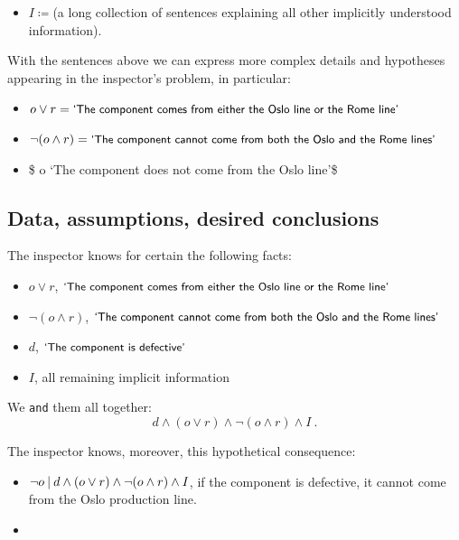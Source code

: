 \documentclass[
  a4paper,
  DIV=11,
  numbers=noendperiod,
  oneside]{scrreprt}
\providecommand{\tightlist}{%
  \setlength{\itemsep}{0pt}\setlength{\parskip}{0pt}}\usepackage{longtable,booktabs,array}
\begin{document}
\begin{itemize}
\tightlist
\item
  \(I \coloneqq{}\)(a long collection of sentences explaining all other
  implicitly understood information).\\
\end{itemize}

With the sentences above we can express more complex details and
hypotheses appearing in the inspector's problem, in particular:

\begin{itemize}
\item
  \(o \lor r = \textsf{\small`The component comes from either the Oslo line or the Rome line'}\)
\item
  \(\lnot(o \land r) = \textsf{\small`The component cannot come from both the Oslo and the Rome lines'}\)
\item
  \$ \lnot o
  \coloneqq \textsf{\small`The component does not come from the Oslo line'}\$
\end{itemize}

\hypertarget{data-assumptions-desired-conclusions}{%
\subsection{Data, assumptions, desired
conclusions}\label{data-assumptions-desired-conclusions}}

The inspector knows for certain the following facts:

\begin{itemize}
\item
  \(o \lor r\),
  \(\textsf{\small`The component comes from either the Oslo line or the Rome line'}\)
\item
  \(\lnot(o \land r)\),
  \(\textsf{\small`The component cannot come from both the Oslo and the Rome lines'}\)
\item
  \(d\), \(\textsf{\small`The component is defective'}\)
\item
  \(I\), all remaining implicit information
\end{itemize}

We \texttt{and} them all together: \[
d \land (o \lor r) \land \lnot (o \land r) \land I \ .
\]

The inspector knows, moreover, this hypothetical consequence:

\begin{itemize}
\item
  \(\lnot o \nonscript\:\vert\nonscript\:\mathopen{} d \land (o \lor r) \land \lnot (o \land r) \land I\),
  if the component is defective, it cannot come from the Oslo production
  line.
\item
\end{itemize}
\end{document}

